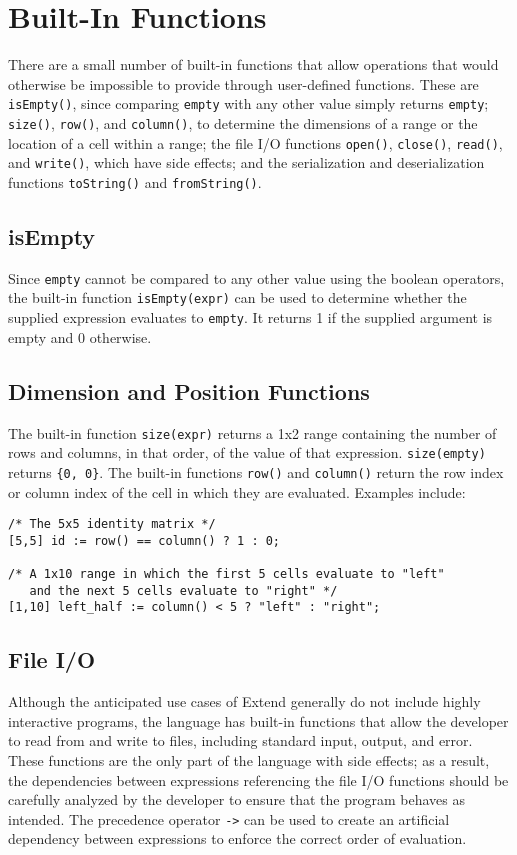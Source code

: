 \section {Built-In Functions}
There are a small number of built-in functions that allow operations that would otherwise be impossible to provide through user-defined functions. These are \texttt{isEmpty()}, since comparing \texttt{empty} with any other value simply returns \texttt{empty}; \texttt{size()}, \texttt{row()}, and \texttt{column()}, to determine the dimensions of a range or the location of a cell within a range; the file I/O functions \texttt{open()}, \texttt{close()}, \texttt{read()}, and \texttt{write()}, which have side effects; and the serialization and deserialization functions \texttt{toString()} and \texttt{fromString()}.
\subsection{isEmpty}
Since \texttt{empty} cannot be compared to any other value using the boolean operators, the built-in function \texttt{isEmpty(expr)} can be used to determine whether the supplied expression evaluates to \texttt{empty}. It returns 1 if the supplied argument is empty and 0 otherwise.
\subsection{Dimension and Position Functions}
The built-in function \texttt{size(expr)} returns a 1x2 range containing the number of rows and columns, in that order, of the value of that expression. \texttt{size(empty)} returns \texttt{\{0, 0\}}. The built-in functions \texttt{row()} and \texttt{column()} return the row index or column index of the cell in which they are evaluated. Examples include:

\begin{lstlisting}
/* The 5x5 identity matrix */
[5,5] id := row() == column() ? 1 : 0; 

/* A 1x10 range in which the first 5 cells evaluate to "left"
   and the next 5 cells evaluate to "right" */
[1,10] left_half := column() < 5 ? "left" : "right";
\end{lstlisting}
\subsection{File I/O}
\label{sec:IO}
Although the anticipated use cases of Extend generally do not include highly interactive programs, the language has built-in functions that allow the developer to read from and write to files, including standard input, output, and error. These functions are the only part of the language with side effects; as a result, the dependencies between expressions referencing the file I/O functions should be carefully analyzed by the developer to ensure that the program behaves as intended. The precedence operator \texttt{->} can be used to create an artificial dependency between expressions to enforce the correct order of evaluation.
